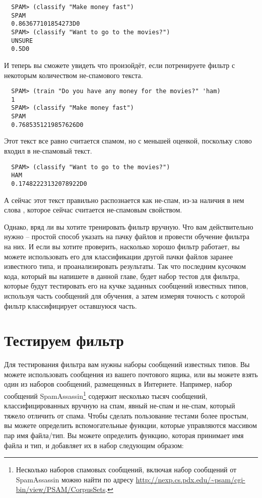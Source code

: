 \begin{verbatim}
  SPAM> (classify "Make money fast")
  SPAM
  0.863677101854273D0
  SPAM> (classify "Want to go to the movies?")
  UNSURE
  0.5D0
\end{verbatim}

И теперь вы сможете увидеть что произойдёт, если потренируете фильтр с некоторым
количеством не-спамового текста.

\begin{verbatim}
  SPAM> (train "Do you have any money for the movies?" 'ham)
  1
  SPAM> (classify "Make money fast")
  SPAM
  0.7685351219857626D0
\end{verbatim}

Этот текст все равно считается спамом, но с меньшей оценкой, поскольку слово 
входил в не-спамовый текст.

\begin{verbatim}
  SPAM> (classify "Want to go to the movies?")
  HAM
  0.17482223132078922D0
\end{verbatim}

А сейчас этот текст правильно распознается как не-спам, из-за наличия в нем слова
, которое сейчас считается не-спамовым свойством.

Однако, вряд ли вы хотите тренировать фильтр вручную.  Что вам действительно нужно --
простой способ указать на пачку файлов и провести обучение фильтра на них.  И если вы
хотите проверить, насколько хорошо фильтр работает, вы можете использовать его для
классификации другой пачки файлов заранее известного типа, и проанализировать результаты.
Так что последним кусочком кода, который вы напишете в данной главе, будет набор тестов
для фильтра, которые будут тестировать его на кучке заданных сообщений известных типов,
используя часть сообщений для обучения, а затем измеряя точность с которой фильтр
классифицирует оставшуюся часть.

\section{Тестируем фильтр}

Для тестирования фильтра вам нужны наборы сообщений известных типов.  Вы можете
использовать сообщения из вашего почтового ящика, или вы можете взять один из наборов
сообщений, размещенных в Интернете.  Например, набор сообщений
SpamAssassin\footnote{Несколько наборов спамовых сообщений, включая набор сообщений от
  SpamAssassin можно найти по адресу
  \url{http://nexp.cs.pdx.edu/~psam/cgi-bin/view/PSAM/CorpusSets}.} содержит несколько
тысяч сообщений, классифицированных вручную на спам, явный не-спам и не-спам, который
тяжело отличить от спама.  Чтобы сделать пользование тестами более простым, вы можете
определить вспомогательные функции, которые управляются массивом пар имя файла/тип.  Вы
можете определить функцию, которая принимает имя файла и тип, и добавляет их в набор
следующим образом:

